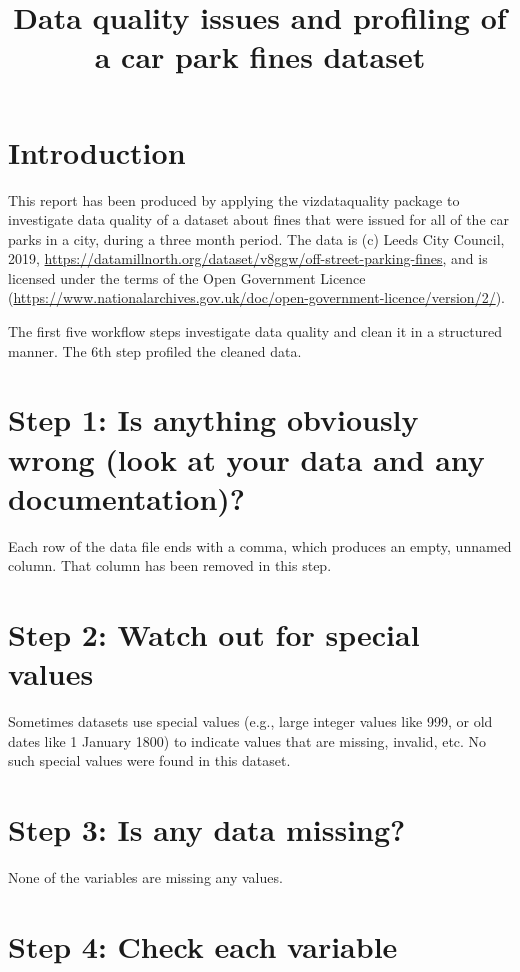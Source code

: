 \documentclass[12pt]{article}
\title{Data quality issues and profiling of a car park fines dataset}
\begin{document}
\maketitle

\section{Introduction}

This report has been produced by applying the vizdataquality package to investigate data quality of a dataset about fines that were issued for all of the car parks in a city, during a three month period. The data is (c) Leeds City Council, 2019, \url{https://datamillnorth.org/dataset/v8ggw/off-street-parking-fines}, and is licensed under the terms of the Open Government Licence (\url{https://www.nationalarchives.gov.uk/doc/open-government-licence/version/2/}).

The first five workflow steps investigate data quality and clean it in a structured manner. The 6th step profiled the cleaned data.

\section{Step 1: Is anything obviously wrong (look at your data and any documentation)?}

Each row of the data file ends with a comma, which produces an empty, unnamed column. That column has been removed in this step.

\section{Step 2: Watch out for special values}

Sometimes datasets use special values (e.g., large integer values like 999, or old dates like 1 January 1800) to indicate values that are missing, invalid, etc. No such special values were found in this dataset.

\section{Step 3: Is any data missing?}

None of the variables are missing any values.

\section{Step 4: Check each variable}
\end{document}
